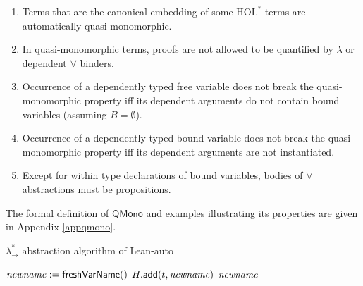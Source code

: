   \begin{enumerate}
    \item Terms that are the canonical embedding of some $\text{HOL}^*$ terms are automatically quasi-monomorphic.
    \item In quasi-monomorphic terms, proofs are not allowed to be quantified by
      $\lambda$ or dependent $\forall$ binders.
    \item Occurrence of a dependently typed free variable does not break the quasi-monomorphic property iff
      its dependent arguments do not contain bound variables (assuming $B = \emptyset$).
    \item Occurrence of a dependently typed bound variable does not break the quasi-monomorphic property iff
      its dependent arguments are not instantiated.
    \item Except for within type declarations of bound variables, bodies of $\forall$ abstractions must be propositions.
  \end{enumerate}

  The formal definition of $\mathsf{QMono}$ and examples illustrating its properties are given in Appendix \ref{appqmono}.

\begin{algorithm}\label{lamabst}
  \DontPrintSemicolon
  \SetNoFillComment
  \caption{$\lambda_\to^*$ abstraction algorithm of Lean-auto}
   {
    $\mathit{newname} := \mathsf{freshVarName}()$ \;
    $H.\mathsf{add}(t, \mathit{newname})$ \;
    \Return $\mathit{newname}$ 
  }
  \;
\end{algorithm}


